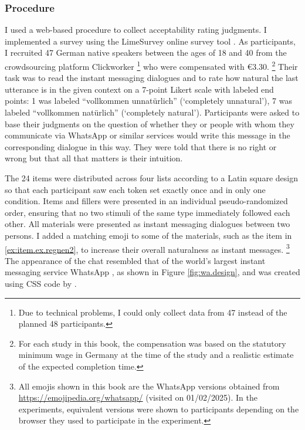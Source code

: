 \subsubsection{Procedure} \label{sec:exp.ex.procedure}
I used a web-based procedure to collect acceptability rating judgments.
I implemented a survey using the LimeSurvey online survey tool \citep{limesurveygmbh}.
As participants, I recruited 47 German native speakers between the ages of 18 and 40 from the crowdsourcing platform Clickworker \citep{clickworker2022}%
\footnote{Due to technical problems, I could only collect data from 47 instead of the planned 48 participants.}
%
who were compensated with €3.30.%
\footnote{For each study in this book, the compensation was based on the statutory minimum wage in Germany at the time of the study and a realistic estimate of the expected completion time.}
%
Their task was to read the instant messaging dialogues and to rate how natural the last utterance is in the given context on a 7-point Likert scale with labeled end points: 1 was labeled ``vollkommen unnatürlich'' (`completely unnatural'), 7 was labeled ``vollkommen natürlich'' (`completely natural').
Participants were asked to base their judgments on the question of whether they or people with whom they communicate via WhatsApp or similar services would write this message in the corresponding dialogue in this way.
They were told that there is no right or wrong but that all that matters is their intuition.

The 24 items were distributed across four lists according to a Latin square design so that each participant saw each token set exactly once and in only one condition.
Items and fillers were presented in an individual pseudo-randomized order, ensuring that no two stimuli of the same type immediately followed each other.
All materials were presented as instant messaging dialogues between two persons.
I added a matching emoji to some of the materials, such as the item in \ref{ex:item.ex.regnen2}, to increase their overall naturalness as instant messages.%
\footnote{All emojis shown in this book are the WhatsApp versions obtained from \url{https://emojipedia.org/whatsapp/} (visited on 01/02/2025).
In the experiments, equivalent versions were shown to participants depending on the browser they used to participate in the experiment.}
%
The appearance of the chat resembled that of the world's largest instant messaging service WhatsApp \citep{statista2022}, as shown in Figure \ref{fig:wa.design}, and was created using CSS code by \citet{rocha2022}.

